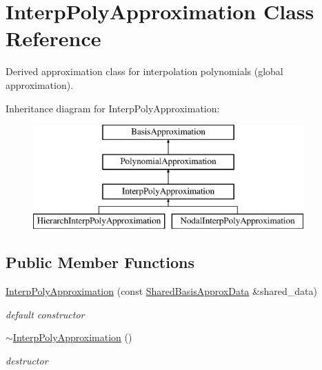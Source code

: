 \section{Interp\+Poly\+Approximation Class Reference}
\label{classPecos_1_1InterpPolyApproximation}


Derived approximation class for interpolation polynomials (global approximation).  


Inheritance diagram for Interp\+Poly\+Approximation\+:\begin{figure}[H]
\begin{center}
\leavevmode
\includegraphics[height=4.000000cm]{classPecos_1_1InterpPolyApproximation}
\end{center}
\end{figure}
\subsection*{Public Member Functions}
\begin{DoxyCompactItemize}
\item 
\hyperlink{classPecos_1_1InterpPolyApproximation_af71906e1c253c3f28a63e602882ab16f}{Interp\+Poly\+Approximation} (const \hyperlink{classPecos_1_1SharedBasisApproxData}{Shared\+Basis\+Approx\+Data} \&shared\+\_\+data)\label{classPecos_1_1InterpPolyApproximation_af71906e1c253c3f28a63e602882ab16f}

\begin{DoxyCompactList}\small\item\em default constructor \end{DoxyCompactList}\item 
\hyperlink{classPecos_1_1InterpPolyApproximation_ab1015d603f22b30086ed9e2a9ef7c4c5}{$\sim$\+Interp\+Poly\+Approximation} ()\label{classPecos_1_1InterpPolyApproximation_ab1015d603f22b30086ed9e2a9ef7c4c5}

\begin{DoxyCompactList}\small\item\em destructor \end{DoxyCompactList}\end{DoxyCompactItemize}
